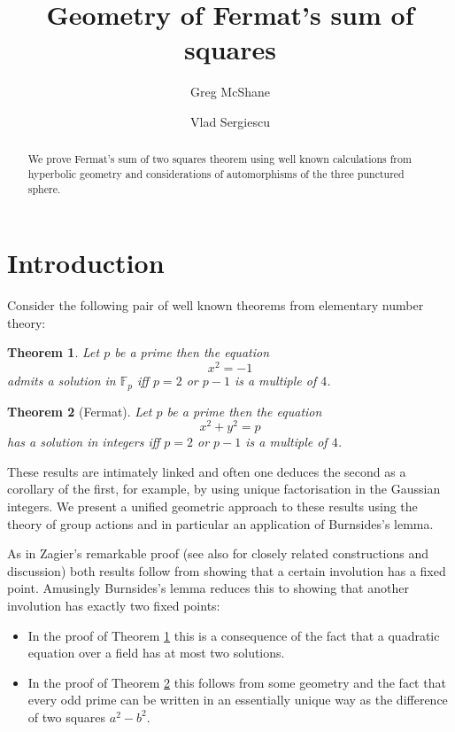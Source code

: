 \documentclass[12pt,a4paper]{amsart}
\title{Geometry of Fermat's sum of squares}
\author[McShane]{Greg McShane}
\author[Vlad]{Vlad Sergiescu}
\newtheorem{thm}{Theorem}[section]
\def\fp{\mathbb{F}_p}
\begin{document}
\maketitle

\begin{abstract} 
We prove Fermat's sum  of two squares theorem 
using well known calculations from hyperbolic geometry 
and considerations of automorphisms of the three punctured sphere.
\end{abstract} 

\section{Introduction}


Consider the following pair of well known theorems from elementary number theory:

\begin{thm}\label{triv}
Let $p$ be a prime then the equation
$$x^2 = -1$$
admits a solution in $\fp$ iff 
$p=2$ or $p-1$ is a multiple of $4$.
\end{thm}


\begin{thm}[Fermat]\label{main}
Let $p$ be a prime then the equation
$$x^2 + y^2 = p $$
has a solution in integers  iff  $p=2$ or $p-1$ is a multiple of $4$.
\end{thm}

These results are intimately linked and often one deduces the second as a corollary of the first,
 for example, by using unique factorisation in the Gaussian integers.  We present a unified geometric  approach to these results  using the theory of group actions and in particular an application of Burnsides's lemma. 
 
 
As in Zagier's remarkable proof \cite{zagier} 
(see also \cite{heath,north,aigner2,elsholtz} for closely related constructions and discussion)
both results follow from showing that a certain involution has a fixed point. Amusingly Burnsides's lemma reduces this to showing that another involution has exactly two fixed points:
\begin{itemize}
\item  In the proof of Theorem \ref{triv} this is a consequence of the fact that a quadratic equation 
over a field has at most two solutions.
\item In the proof of Theorem \ref{main} this follows from some geometry and the fact that 
	every odd prime can be written in an essentially unique way
	as the difference of two squares $a^2 - b^2$.


 \end{itemize}
\end{document}
